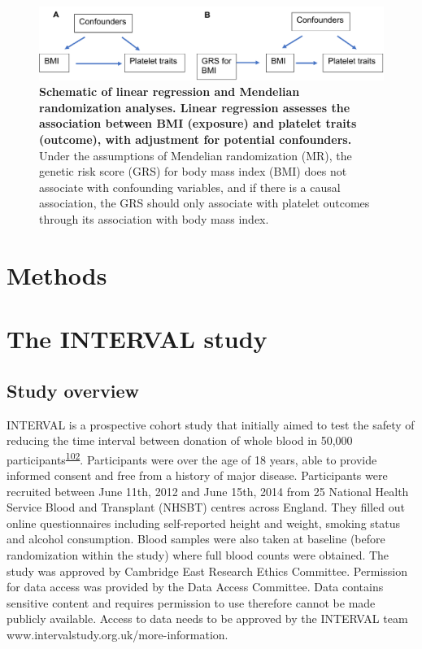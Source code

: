 \documentclass[11pt,twoside]{bristolthesis}
\begin{document}
\begin{figure}

{\centering \includegraphics[width=0.8\linewidth]{figure/BMI_platelets/obsvMRexample} 

}

\caption[Schematic of linear regression and Mendelian randomization frameworks for BMI and platelet trait analyses]{\textbf{Schematic of linear regression and Mendelian randomization analyses. Linear regression assesses the association between BMI (exposure) and platelet traits (outcome), with adjustment for potential confounders.} Under the assumptions of Mendelian randomization (MR), the genetic risk score (GRS) for body mass index (BMI) does not associate with confounding variables, and if there is a causal association, the GRS should only associate with platelet outcomes through its association with body mass index.}\label{fig:Linear-reg-MR}
\end{figure}
\hypertarget{methods}{%
\section{Methods}\label{methods}}

\hypertarget{INTERVAL-study}{%
\section{The INTERVAL study}\label{INTERVAL-study}}

\hypertarget{study-overview}{%
\subsection{Study overview}\label{study-overview}}

INTERVAL is a prospective cohort study that initially aimed to test the safety of reducing the time interval between donation of whole blood in 50,000 participants\textsuperscript{\protect\hyperlink{ref-DiAngelantonio2017}{102}}. Participants were over the age of 18 years, able to provide informed consent and free from a history of major disease. Participants were recruited between June 11th, 2012 and June 15th, 2014 from 25 National Health Service Blood and Transplant (NHSBT) centres across England. They filled out online questionnaires including self-reported height and weight, smoking status and alcohol consumption. Blood samples were also taken at baseline (before randomization within the study) where full blood counts were obtained. The study was approved by Cambridge East Research Ethics Committee. Permission for data access was provided by the Data Access Committee. Data contains sensitive content and requires permission to use therefore cannot be made publicly available. Access to data needs to be approved by the INTERVAL team www.intervalstudy.org.uk/more-information.
\end{document}
